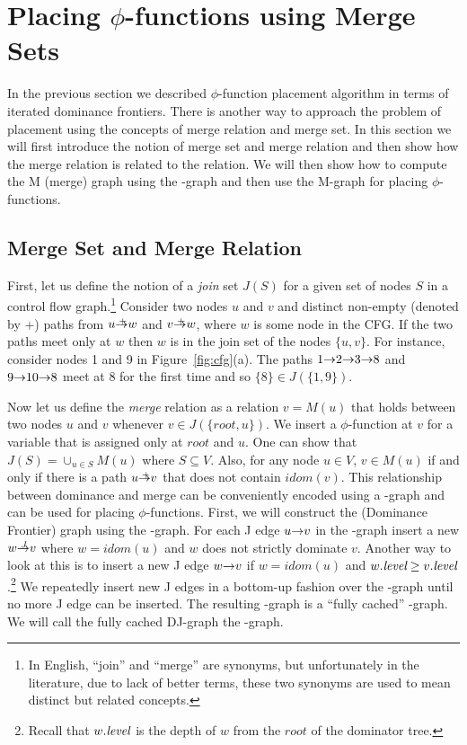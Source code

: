 {\section{Placing $\phi$-functions using Merge Sets}

In the previous section we described $\phi$-function placement algorithm in terms of iterated dominance frontiers. There is another way to approach the problem
of \phifun placement using the concepts of merge relation and merge set. In this section
we will first introduce the notion of merge set and merge relation and then show
how the merge relation is related to the \DF relation. We will then show how to compute
the M (merge) graph using the \DJ-graph and then use the M-graph for placing $\phi$-functions.

\subsection{Merge Set and Merge Relation}

First, let us define the notion of a {\em join} set $J(S)$
 for a given set of nodes  $S$ in a control flow graph.\footnote{In English, ``join'' and ``merge'' are synonyms, 
but unfortunately
in the literature, due to lack of  better terms, these two synonyms are used to mean
distinct but related concepts.} Consider two nodes $u$ and $v$ and distinct 
non-empty (denoted by +)
paths from $u \stplus w$ and $v \stplus w$, where $w$ is some node in the CFG. If the 
two paths meet only at $w$ then $w$ is in the join set of the nodes $\{u, v\}$. 
For instance, consider nodes 1 and 9 in Figure~\ref{fig:cfg}(a).
The paths $1 \st{} 2 \st{} 3 \st{} 8$ and $9 \st{} 10 \st{} 8$ meet at $8$ 
for the first time and so $\{8\} \in J(\{1,9\})$. 

Now let us define the {\em merge} relation as a relation 
$v=M(u)$ that holds between two nodes $u$ and $v$ whenever
$v \in J(\{\textit{root}, u\})$. We insert a $\phi$-function at $v$ for a variable that is assigned
only at $\textit{root}$ and $u$. One can show that $J(S) = \cup_{u \in S} M(u)$ where $S \subseteq V$. Also, for any node $u \in V$, $v \in M(u)$ if and only if
there is a path $u \stplus v$ that does not contain $\textit{idom}(v)$.  This relationship between
dominance and merge can be conveniently encoded using a \DJ-graph and can be used for placing 
$\phi$-functions. First, we will construct the \DF (Dominance Frontier) graph using the \DJ-graph. For each J edge $u \st{} v$ in the \DJ-graph insert a new  $w \st{J} v$ where
$w = \textit{idom} (u)$ and $w$ does not strictly dominate $v$. Another way to look at 
this is to insert a new J edge $w \st{} v$ if $w = \textit{idom}(u)$ and $w.\textit{level} \geq 
v.\textit{level}$.\footnote{Recall that $w.\textit{level}$ is the depth of $w$ from the
$\textit{root}$ of the dominator tree.} We repeatedly insert new J edges in a bottom-up fashion over the \DJ-graph until no more J edge can be inserted. The resulting \DJ-graph is a ``fully cached'' \DJ-graph. We will call the fully cached DJ-graph the \DF-graph.

}
